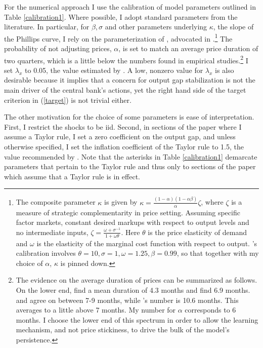\documentclass[11pt]{article}
\renewcommand{\[}{\begin{equation}}
\renewcommand{\]}{\end{equation}}
\begin{document}
For the numerical approach I use the calibration of model parameters outlined in Table \ref{calibration1}. Where possible, I adopt standard parameters from the literature. In particular, for $\beta, \sigma$ and other parameters underlying $\kappa$, the slope of the Phillips curve, I rely on the parameterization of \cite{chari2000sticky}, advocated in \cite{woodford2011interest}.\footnote{The composite parameter $\kappa$ is given by  $\kappa = \frac{(1-\alpha)(1-\alpha\beta)}{\alpha} \zeta$, where $\zeta$ is a measure of strategic complementarity in price setting. Assuming specific factor markets, constant desired markups with respect to output levels and no intermediate inputs, $\zeta = \frac{\omega + \sigma^{-1}}{1+\omega\theta}$. Here $\theta$ is the price elasticity of demand and $\omega$ is the elasticity of the marginal cost function with respect to output. \cite{chari2000sticky}'s calibration involves  $\theta =10, \sigma =1, \omega = 1.25, \beta = 0.99$, so that together with my choice of $\alpha$, $\kappa$ is pinned down.} The probability of not adjusting prices, $\alpha$, is set to match an average price duration of two quarters, which is a little below the numbers found in empirical studies.\footnote{The evidence on the average duration of prices can be summarized as follows. On the lower end, \cite{bils2004some} find a mean duration of 4.3 months and \cite{klenow2010microeconomic} find 6.9 months. \cite{klenow2008state} and \cite{nakamura2008five} agree on between 7-9 months, while \cite{eichenbaum2011reference}'s number is 10.6 months. This averages to a little above 7 months. My number for $\alpha$ corresponds to 6 months. I choose the lower end of this spectrum in order to allow the learning mechanism, and not price stickiness, to drive the bulk of the model's persistence.} 
I set $\lambda_x$ to 0.05, the value estimated by \cite{rotemberg1997optimization}. A low, nonzero value for $\lambda_x$ is also desirable because it implies that a concern for output gap stabilization is not the main driver of the central bank's actions, yet the right hand side of the target criterion in (\ref{target}) is not trivial either.

The other motivation for the choice of some parameters is ease of interpretation. First, I restrict the shocks to be iid. Second, in sections of the paper where I assume a Taylor rule, I set a zero coefficient on the output gap, and unless  otherwise specified, I set the inflation coefficient of the Taylor rule to 1.5, the value recommended by \cite{taylor1993discretion}. Note that the asterisks in Table \ref{calibration1} demarcate parameters that pertain to the Taylor rule and thus only to sections of the paper which assume that a Taylor rule is in effect.
\end{document}
